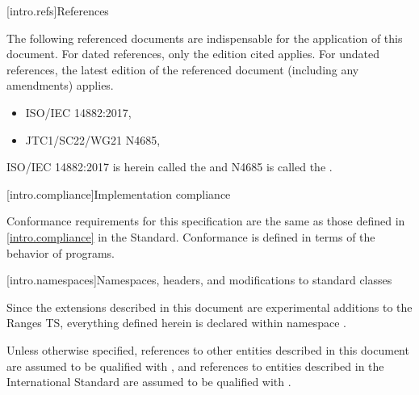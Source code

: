 [intro.refs]{References}

\pnum
The following referenced documents are indispensable for the
application of this document. For dated references, only the
edition cited applies. For undated references, the latest edition
of the referenced document (including any amendments) applies.

\begin{itemize}
\item ISO/IEC 14882:2017, 
\item JTC1/SC22/WG21 N4685, 
\end{itemize}

ISO/IEC 14882:2017 is herein called the \defn{C\Rplus\Rplus\xspace Standard} and N4685 is called
the .

[intro.compliance]{Implementation compliance}

\pnum
Conformance requirements for this specification are the same as those
defined in \ref{intro.compliance} in the \Cpp Standard.
\enternote
Conformance is defined in terms of the behavior of programs.
\exitnote

[intro.namespaces]{Namespaces, headers, and modifications to standard classes}

\pnum
Since the extensions described in this document are experimental additions to the Ranges TS,
everything defined herein is declared within namespace .

\pnum
Unless otherwise specified, references to other entities described in this
document are assumed to be qualified with , and
references to entities described in the International Standard are assumed to be
qualified with .

